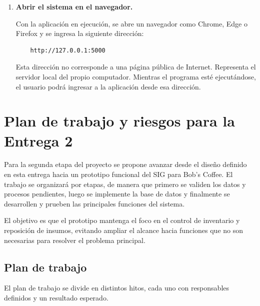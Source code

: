 \documentclass[11pt,letterpaper]{article}
\begin{document}
\begin{enumerate}
    \item \textbf{Abrir el sistema en el navegador.}

    Con la aplicación en ejecución, se abre un navegador como Chrome, Edge o Firefox y se ingresa la siguiente dirección:

    \begin{verbatim}
    http://127.0.0.1:5000
    \end{verbatim}

    Esta dirección no corresponde a una página pública de Internet. Representa el servidor local del propio computador. Mientras el programa esté ejecutándose, el usuario podrá ingresar a la aplicación desde esa dirección.

\end{enumerate}

\newpage

\section{Plan de trabajo y riesgos para la Entrega 2}

Para la segunda etapa del proyecto se propone avanzar desde el diseño definido en esta entrega hacia un prototipo funcional del SIG para Bob’s Coffee. El trabajo se organizará por etapas, de manera que primero se validen los datos y procesos pendientes, luego se implemente la base de datos y finalmente se desarrollen y prueben las principales funciones del sistema.

El objetivo es que el prototipo mantenga el foco en el control de inventario y reposición de insumos, evitando ampliar el alcance hacia funciones que no son necesarias para resolver el problema principal.

\subsection{Plan de trabajo}

El plan de trabajo se divide en distintos hitos, cada uno con responsables definidos y un resultado esperado.
\end{document}
